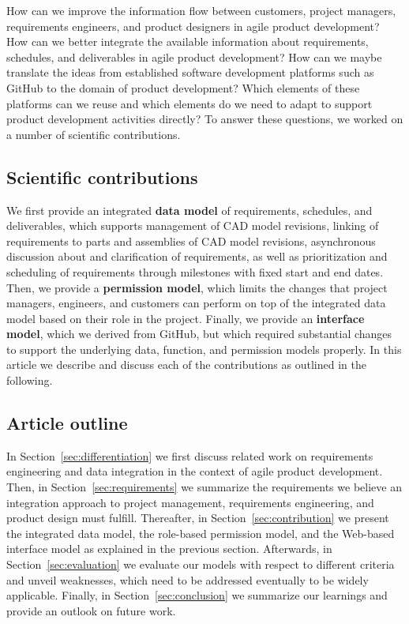 How can we improve the information flow between customers, project managers, requirements engineers, and product designers in agile product development?
How can we better integrate the available information about requirements, schedules, and deliverables in agile product development?
How can we maybe translate the ideas from established software development platforms such as GitHub to the domain of product development?
Which elements of these platforms can we reuse and which elements do we need to adapt to support product development activities directly?
To answer these questions, we worked on a number of scientific contributions.

\subsection{Scientific contributions}

We first provide an integrated \textbf{data model} of requirements, schedules, and deliverables, which supports management of CAD model revisions, linking of requirements to parts and assemblies of CAD model revisions, asynchronous discussion about and clarification of requirements, as well as prioritization and scheduling of requirements through milestones with fixed start and end dates.
Then, we provide a \textbf{permission model}, which limits the changes that project managers, engineers, and customers can perform on top of the integrated data model based on their role in the project.
Finally, we provide an \textbf{interface model}, which we derived from GitHub, but which required substantial changes to support the underlying data, function, and permission models properly.
In this article we describe and discuss each of the contributions as outlined in the following.

\subsection{Article outline}

In Section~\ref{sec:differentiation} we first discuss related work on requirements engineering and data integration in the context of agile product development.
Then, in Section~\ref{sec:requirements} we summarize the requirements we believe an integration approach to project management, requirements engineering, and product design must fulfill.
Thereafter, in Section~\ref{sec:contribution} we present the integrated data model, the role-based permission model, and the Web-based interface model as explained in the previous section.
Afterwards, in Section~\ref{sec:evaluation} we evaluate our models with respect to different criteria and unveil weaknesses, which need to be addressed eventually to be widely applicable.
Finally, in Section~\ref{sec:conclusion} we summarize our learnings and provide an outlook on future work.